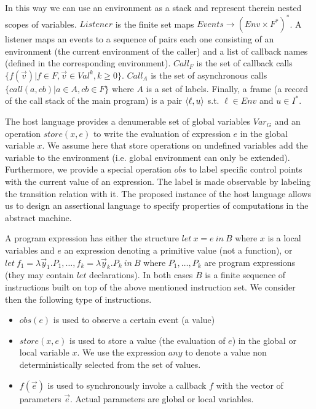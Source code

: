 In this way we can use an environment as a stack and represent therein nested scopes of variables.
$Listener$ is the finite set maps $Events\rightarrow (Env\times F^*)^*$. 
A listener maps an events to a sequence of pairs each one consisting of an environment (the current environment of the caller) and a list of callback names (defined in the corresponding environment).
$Call_F$ is the set of callback calls $\{ f(\vec{v})| f\in F,\vec{v}\in Val^k,k\geq 0\}$. 
$Call_A$ is the set of asynchronous calls $\{ call(a,cb)| a\in A,cb\in F\}$ where $A$ is a set of labels.
Finally, a frame (a record of the call stack of the main program) is a pair $\langle \ell,u \rangle$ s.t. 
$\ell\in Env$ and $u\in I^*$.

The host language provides a denumerable set of global variables $Var_G$ and an  operation $store(x,e)$ to write the evaluation of  expression $e$ in the global variable $x$. We assume here that store operations on undefined variables add the variable to the environment (i.e. global environment can only be extended).
Furthermore, we provide a special operation $obs$ to label specific control points with the current value of an expression. The label is made observable by labeling the transition relation with it. 
The proposed instance of  the host language allows us to design an assertional language to specify properties of computations in the abstract machine.
%

A program expression has either the structure $let \ x=e\ in\ B$ where $x$ is a local variables
and $e$ an expression denoting a primitive value (not a function),
or $let \ f_1=\lambda \vec{y}_1.P_1, \ldots, f_k=\lambda \vec{y}_k.P_k\ in\ B$
 where $P_1,\ldots,P_k$ are program expressions (they may contain $let$ declarations).
In both cases $B$ is a finite sequence of instructions built on top of the above mentioned instruction set.
%
We consider then the following type of instructions.
\begin{itemize}
\item
$obs(e)$ is used to observe a certain event (a value)
\item
$store(x,e)$ is used to store a value (the evaluation of $e$) in the global or local variable $x$.
We use the expression $any$ to denote a value non deterministically selected from the set of values.
\item
$f(\vec{e})$ is used to synchronously invoke a callback $f$ with the vector of parameters $\vec{e}$.
Actual parameters are global or local variables. 
\end{itemize}

